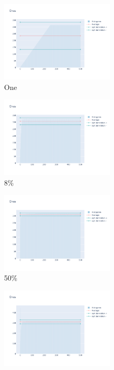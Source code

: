 \documentclass[12pt, fleqn]{report}                             %
\theoremstyle{break}                                            %
\begin{document}
      \begin{figure}[ht!]
        \centering
        \begin{subfigure}[b]{0.4\linewidth}
          \includegraphics[width=0.6\textwidth]{Images/62/dia-a.png}
          \caption{One}
        \end{subfigure}
        \begin{subfigure}[b]{0.4\linewidth}
          \includegraphics[width=0.6\textwidth]{Images/62/dia-b.png}
          \caption{8\%}
        \end{subfigure}
        \begin{subfigure}[b]{0.4\linewidth}
          \includegraphics[width=0.6\textwidth]{Images/62/dia-c.png}
          \caption{50\%}
        \end{subfigure}
        \begin{subfigure}[b]{0.4\linewidth}
          \includegraphics[width=0.6\textwidth]{Images/62/dia-d.png}

\end{subfigure}
\end{figure}
\end{document}
